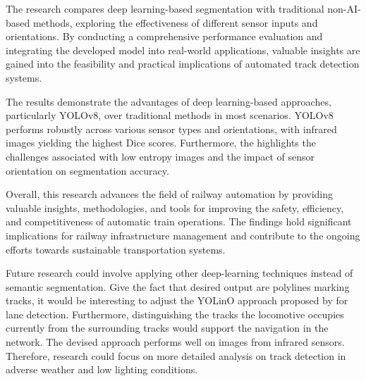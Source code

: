 \documentclass[Master,MDS,english]{BASE/twbook} %
\begin{document}
The research compares deep learning-based segmentation with traditional non-AI-based methods, exploring the effectiveness of different sensor inputs and orientations. By conducting a comprehensive performance evaluation and integrating the developed model into real-world applications, valuable insights are gained into the feasibility and practical implications of automated track detection systems.

The results demonstrate the advantages of deep learning-based approaches, particularly YOLOv8, over traditional methods in most scenarios. YOLOv8 performs robustly across various sensor types and orientations, with infrared images yielding the highest Dice scores. Furthermore, the highlights the challenges associated with low entropy images and the impact of sensor orientation on segmentation accuracy.

Overall, this research advances the field of railway automation by providing valuable insights, methodologies, and tools for improving the safety, efficiency, and competitiveness of automatic train operations. The findings hold significant implications for railway infrastructure management and contribute to the ongoing efforts towards sustainable transportation systems.

Future research could involve applying other deep-learning techniques instead of semantic segmentation. Give the fact that desired output are polylines marking tracks, it would be interesting to adjust the YOLinO approach proposed by \cite{meyer2021yolino} for lane detection. Furthermore, distinguishing the tracks the locomotive occupies currently from the surrounding tracks would support the navigation in the network. 
The devised approach performs well on images from infrared sensors. Therefore, research could focus on more detailed analysis on track detection in adverse weather and low lighting conditions. 










\clearpage                                                       %

\end{document}

